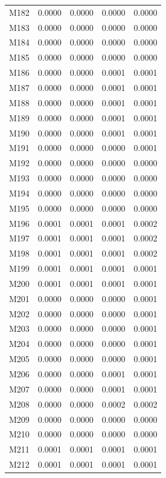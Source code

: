 \begin{longtable}{lrrrr}
M182 & 0.0000 & 0.0000 & 0.0000 & 0.0000 \\
M183 & 0.0000 & 0.0000 & 0.0000 & 0.0000 \\
M184 & 0.0000 & 0.0000 & 0.0000 & 0.0000 \\
M185 & 0.0000 & 0.0000 & 0.0000 & 0.0000 \\
M186 & 0.0000 & 0.0000 & 0.0001 & 0.0001 \\
M187 & 0.0000 & 0.0000 & 0.0001 & 0.0001 \\
M188 & 0.0000 & 0.0000 & 0.0001 & 0.0001 \\
M189 & 0.0000 & 0.0000 & 0.0001 & 0.0001 \\
M190 & 0.0000 & 0.0000 & 0.0001 & 0.0001 \\
M191 & 0.0000 & 0.0000 & 0.0000 & 0.0001 \\
M192 & 0.0000 & 0.0000 & 0.0000 & 0.0000 \\
M193 & 0.0000 & 0.0000 & 0.0000 & 0.0000 \\
M194 & 0.0000 & 0.0000 & 0.0000 & 0.0000 \\
M195 & 0.0000 & 0.0000 & 0.0000 & 0.0000 \\
M196 & 0.0001 & 0.0001 & 0.0001 & 0.0002 \\
M197 & 0.0001 & 0.0001 & 0.0001 & 0.0002 \\
M198 & 0.0001 & 0.0001 & 0.0001 & 0.0002 \\
M199 & 0.0001 & 0.0001 & 0.0001 & 0.0001 \\
M200 & 0.0001 & 0.0001 & 0.0001 & 0.0001 \\
M201 & 0.0000 & 0.0000 & 0.0000 & 0.0001 \\
M202 & 0.0000 & 0.0000 & 0.0000 & 0.0001 \\
M203 & 0.0000 & 0.0000 & 0.0000 & 0.0001 \\
M204 & 0.0000 & 0.0000 & 0.0000 & 0.0001 \\
M205 & 0.0000 & 0.0000 & 0.0000 & 0.0001 \\
M206 & 0.0000 & 0.0000 & 0.0001 & 0.0001 \\
M207 & 0.0000 & 0.0000 & 0.0001 & 0.0001 \\
M208 & 0.0000 & 0.0000 & 0.0002 & 0.0002 \\
M209 & 0.0000 & 0.0000 & 0.0000 & 0.0000 \\
M210 & 0.0000 & 0.0000 & 0.0000 & 0.0000 \\
M211 & 0.0001 & 0.0001 & 0.0001 & 0.0001 \\
M212 & 0.0001 & 0.0001 & 0.0001 & 0.0001 \\

\end{longtable}
